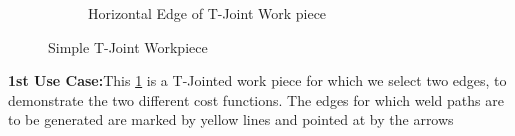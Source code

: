 \begin{figure}[!htbp]
\begin{subfigure}[b]{0.4\textwidth}
		\caption{Horizontal Edge of T-Joint Work  piece} 
	\end{subfigure}		
	\caption{Simple T-Joint Workpiece}  
	\label{fig:uc1}
\end{figure}
\textbf{1st Use Case:}This \ref{fig:uc1} is a T-Jointed work piece for which we select two edges, to demonstrate the two different cost functions. The edges for which weld paths are to be generated are marked by yellow lines and pointed at by the arrows

